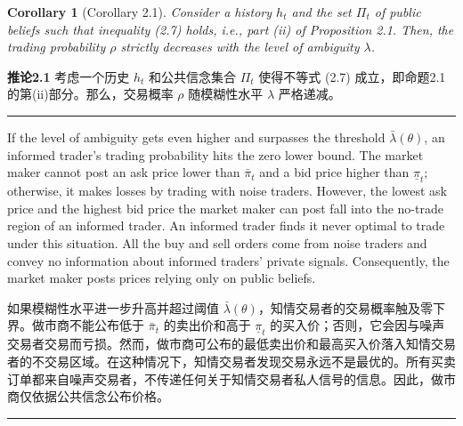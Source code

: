 \documentclass[12pt,a4paper]{article}
\newenvironment{original}{%
  \par\vspace{4pt}\noindent%
  \color{black}%
  \ignorespaces
}{%
  \par\vspace{2pt}%
}
\newenvironment{translation}{%
  \par\vspace{2pt}\noindent%
  \color{transblue}%
  \ignorespaces
}{%
  \par\vspace{4pt}\hrule\vspace{6pt}%
}
\newtheorem{corollary}[theorem]{Corollary}
\begin{document}
\begin{corollary}[Corollary 2.1]
Consider a history $h_t$ and the set $\Pi_t$ of public beliefs such that inequality (2.7) holds, i.e., part (ii) of Proposition 2.1. Then, the trading probability $\rho$ strictly decreases with the level of ambiguity $\lambda$.
\end{corollary}
\begin{translation}
\textbf{推论2.1} 考虑一个历史 $h_t$ 和公共信念集合 $\Pi_t$ 使得不等式 (2.7) 成立，即命题2.1的第(ii)部分。那么，交易概率 $\rho$ 随模糊性水平 $\lambda$ 严格递减。
\end{translation}

\begin{original}
If the level of ambiguity gets even higher and surpasses the threshold $\bar{\lambda}(\theta)$, an informed trader's trading probability hits the zero lower bound. The market maker cannot post an ask price lower than $\bar{\pi}_t$ and a bid price higher than $\underline{\pi}_t$; otherwise, it makes losses by trading with noise traders. However, the lowest ask price and the highest bid price the market maker can post fall into the no-trade region of an informed trader. An informed trader finds it never optimal to trade under this situation. All the buy and sell orders come from noise traders and convey no information about informed traders' private signals. Consequently, the market maker posts prices relying only on public beliefs.
\end{original}
\begin{translation}
如果模糊性水平进一步升高并超过阈值 $\bar{\lambda}(\theta)$，知情交易者的交易概率触及零下界。做市商不能公布低于 $\bar{\pi}_t$ 的卖出价和高于 $\underline{\pi}_t$ 的买入价；否则，它会因与噪声交易者交易而亏损。然而，做市商可公布的最低卖出价和最高买入价落入知情交易者的不交易区域。在这种情况下，知情交易者发现交易永远不是最优的。所有买卖订单都来自噪声交易者，不传递任何关于知情交易者私人信号的信息。因此，做市商仅依据公共信念公布价格。
\end{translation}
\end{document}
